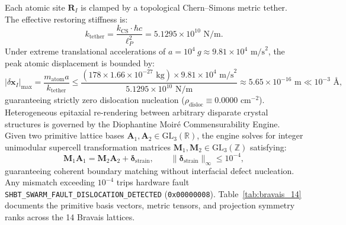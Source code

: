 \documentclass[11pt,onecolumn]{article}
\begin{document}
Each atomic site $\mathbf{R}_I$ is clamped by a topological Chern--Simons metric tether. The effective restoring stiffness is:
\begin{equation}
k_{\text{tether}} = \frac{k_{\text{CS}} \cdot \hbar c}{\ell_P^2} = 5.1295 \times 10^{10}\text{ N/m}.
\label{eq:chern_simons_tether_stiffness}
\end{equation}
Under extreme translational accelerations of $a = 10^4\ g \approx 9.81 \times 10^4\text{ m/s}^2$, the peak atomic displacement is bounded by:
\begin{equation}
|\delta\mathbf{x}_I|_{\max} = \frac{m_{\text{atom}} a}{k_{\text{tether}}} \le \frac{(178 \times 1.66 \times 10^{-27}\text{ kg}) \times 9.81 \times 10^4\text{ m/s}^2}{5.1295 \times 10^{10}\text{ N/m}} \approx 5.65 \times 10^{-16}\text{ m} \ll 10^{-3}\text{ \AA},
\label{eq:atomic_displacement_bound}
\end{equation}
guaranteeing strictly zero dislocation nucleation ($\rho_{\text{disloc}} \equiv 0.0000\text{ cm}^{-2}$). Heterogeneous epitaxial re-rendering between arbitrary disparate crystal structures is governed by the Diophantine Moir\'e Commensurability Engine. Given two primitive lattice bases $\mathbf{A}_1, \mathbf{A}_2 \in \mathrm{GL}_3(\mathbb{R})$, the engine solves for integer unimodular supercell transformation matrices $\mathbf{M}_1, \mathbf{M}_2 \in \mathrm{GL}_3(\mathbb{Z})$ satisfying:
\begin{equation}
\mathbf{M}_1 \mathbf{A}_1 = \mathbf{M}_2 \mathbf{A}_2 + \boldsymbol{\delta}_{\text{strain}}, \qquad \|\boldsymbol{\delta}_{\text{strain}}\|_\infty \le 10^{-4},
\label{eq:diophantine_moire_deriv}
\end{equation}
guaranteeing coherent boundary matching without interfacial defect nucleation. Any mismatch exceeding $10^{-4}$ trips hardware fault \\ \texttt{SHBT\_SWARM\_FAULT\_DISLOCATION\_DETECTED} (\texttt{0x00000008}). Table~\ref{tab:bravais_14} documents the primitive basis vectors, metric tensors, and projection symmetry ranks across the 14 Bravais lattices.
\end{document}
